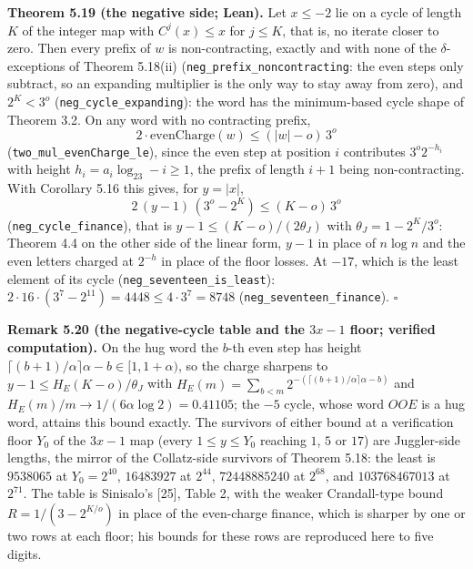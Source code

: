 \documentclass[12pt]{article}
\begin{document}
\textbf{Theorem 5.19 (the negative side; Lean).} Let \(x\le-2\) lie on a
cycle of length \(K\) of the integer map with \(C^j(x)\le x\) for
\(j\le K\), that is, no iterate closer to zero. Then every prefix of
\(w\) is non-contracting, exactly and with none of the
\(\delta\)-exceptions of Theorem 5.18(ii)
(\texttt{\nolinkurl{neg_prefix_noncontracting}}: the even steps only
subtract, so an expanding multiplier is the only way to stay away from
zero), and \(2^K<3^o\) (\texttt{\nolinkurl{neg_cycle_expanding}}): the
word has the minimum-based cycle shape of Theorem 3.2. On any word with
no contracting prefix, \[
2\cdot\mathrm{evenCharge}(w)\le(|w|-o)\,3^{o}
\] (\texttt{\nolinkurl{two_mul_evenCharge_le}}), since the even step at
position \(i\) contributes \(3^{o}2^{-h_i}\) with height
\(h_i=a_i\log_23-i\ge1\), the prefix of length \(i+1\) being
non-contracting. With Corollary 5.16 this gives, for \(y=|x|\), \[
2\,(y-1)\,(3^o-2^K)\le(K-o)\,3^o
\] (\texttt{\nolinkurl{neg_cycle_finance}}), that is
\(y-1\le(K-o)/(2\theta_J)\) with \(\theta_J=1-2^K/3^o\): Theorem 4.4 on
the other side of the linear form, \(y-1\) in place of \(n\log n\) and
the even letters charged at \(2^{-h}\) in place of the floor losses. At
\(-17\), which is the least element of its cycle
(\texttt{\nolinkurl{neg_seventeen_is_least}}):
\(2\cdot16\cdot(3^7-2^{11})=4448\le4\cdot3^7=8748\)
(\texttt{\nolinkurl{neg_seventeen_finance}}). \(\square\)

\textbf{Remark 5.20 (the negative-cycle table and the \(3x-1\) floor;
verified computation).} On the hug word the \(b\)-th even step has
height \(\lceil(b+1)/\alpha\rceil\alpha-b\in[1,1+\alpha)\), so the
charge sharpens to \(y-1\le H_E(K-o)/\theta_J\) with
\(H_E(m)=\sum_{b<m}2^{-(\lceil(b+1)/\alpha\rceil\alpha-b)}\) and
\(H_E(m)/m\to1/(6\alpha\log2)=0.41105\); the \(-5\) cycle, whose word
\(OOE\) is a hug word, attains this bound exactly. The survivors of
either bound at a verification floor \(Y_0\) of the \(3x-1\) map (every
\(1\le y\le Y_0\) reaching \(1\), \(5\) or \(17\)) are Juggler-side
lengths, the mirror of the Collatz-side survivors of Theorem 5.18: the
least is \(9538065\) at \(Y_0=2^{40}\), \(16483927\) at \(2^{44}\),
\(72448885240\) at \(2^{68}\), and \(103768467013\) at \(2^{71}\). The
table is Sinisalo's {[}25{]}, Table 2, with the weaker Crandall-type
bound \(R=1/(3-2^{K/o})\) in place of the even-charge finance, which is
sharper by one or two rows at each floor; his bounds for these rows are
reproduced here to five digits.
\end{document}
